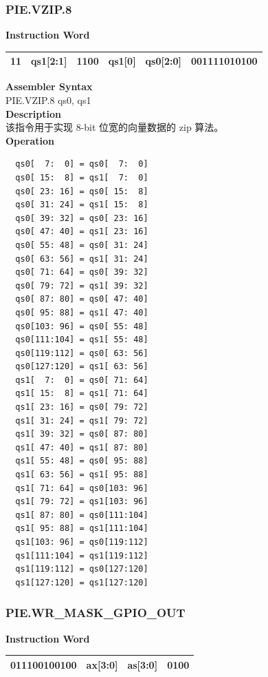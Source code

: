 \newpage
\subsubsection{PIE.VZIP.8}\label{instruction:PIEVZIP8}
\setlength\tabcolsep{6pt}
\textbf{Instruction Word} \\
\begin{tabular}{|c|c|c|c|c|c|}
	\hline
	11 & qs1[2:1] & 1100 & qs1[0] & qs0[2:0] & 001111010100 \\
	\hline
\end{tabular}

\textbf{Assembler Syntax} \\
PIE.VZIP.8 qs0, qs1 \\
\textbf{Description} \\
该指令用于实现 8-bit 位宽的向量数据的 zip 算法。\\
\textbf{Operation}
\begin{lstlisting}
  qs0[  7:  0] = qs0[  7:  0]
  qs0[ 15:  8] = qs1[  7:  0]
  qs0[ 23: 16] = qs0[ 15:  8]
  qs0[ 31: 24] = qs1[ 15:  8]
  qs0[ 39: 32] = qs0[ 23: 16]
  qs0[ 47: 40] = qs1[ 23: 16]
  qs0[ 55: 48] = qs0[ 31: 24]
  qs0[ 63: 56] = qs1[ 31: 24]
  qs0[ 71: 64] = qs0[ 39: 32]
  qs0[ 79: 72] = qs1[ 39: 32]
  qs0[ 87: 80] = qs0[ 47: 40]
  qs0[ 95: 88] = qs1[ 47: 40]
  qs0[103: 96] = qs0[ 55: 48]
  qs0[111:104] = qs1[ 55: 48]
  qs0[119:112] = qs0[ 63: 56]
  qs0[127:120] = qs1[ 63: 56]
  qs1[  7:  0] = qs0[ 71: 64]
  qs1[ 15:  8] = qs1[ 71: 64]
  qs1[ 23: 16] = qs0[ 79: 72]
  qs1[ 31: 24] = qs1[ 79: 72]
  qs1[ 39: 32] = qs0[ 87: 80]
  qs1[ 47: 40] = qs1[ 87: 80]
  qs1[ 55: 48] = qs0[ 95: 88]
  qs1[ 63: 56] = qs1[ 95: 88]
  qs1[ 71: 64] = qs0[103: 96]
  qs1[ 79: 72] = qs1[103: 96]
  qs1[ 87: 80] = qs0[111:104]
  qs1[ 95: 88] = qs1[111:104]
  qs1[103: 96] = qs0[119:112]
  qs1[111:104] = qs1[119:112]
  qs1[119:112] = qs0[127:120]
  qs1[127:120] = qs1[127:120]
\end{lstlisting}

\newpage
\subsubsection{PIE.WR\_MASK\_GPIO\_OUT}\label{instruction:PIEWRMASKGPIOOUT}
\setlength\tabcolsep{6pt}
\textbf{Instruction Word} \\
\begin{tabular}{|c|c|c|c|}
	\hline
	011100100100 & ax[3:0] & as[3:0] & 0100 \\
	\hline
\end{tabular}

